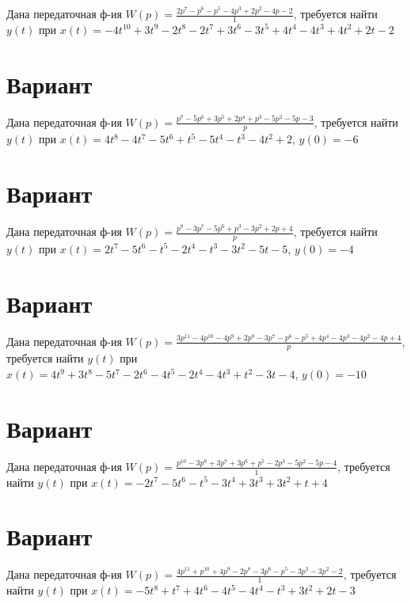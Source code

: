 \documentclass{article}
\begin{document}
Дана передаточная ф-ия $W(p)=\frac{2p^{7}-p^{6}-p^{5}-4p^{3}+2p^{2}-4p-2}{1}$, требуется найти $y(t)$ при $x(t)=-4t^{10}+3t^{9}-2t^{8}-2t^{7}+3t^{6}-3t^{5}+4t^{4}-4t^{3}+4t^{2}+2t-2$



\section{Вариант}

Дана передаточная ф-ия $W(p)=\frac{p^{7}-5p^{6}+3p^{5}+2p^{4}+p^{3}-5p^{2}-5p-3}{p}$, требуется найти $y(t)$ при $x(t)=4t^{8}-4t^{7}-5t^{6}+t^{5}-5t^{4}-t^{3}-4t^{2}+2$, $y(0)=-6$



\section{Вариант}

Дана передаточная ф-ия $W(p)=\frac{p^{8}-3p^{7}-5p^{6}+p^{3}-3p^{2}+2p+4}{p}$, требуется найти $y(t)$ при $x(t)=2t^{7}-5t^{6}-t^{5}-2t^{4}-t^{3}-3t^{2}-5t-5$, $y(0)=-4$



\section{Вариант}

Дана передаточная ф-ия $W(p)=\frac{3p^{11}-4p^{10}-4p^{9}+2p^{8}-3p^{7}-p^{6}-p^{5}+4p^{4}-4p^{3}-4p^{2}-4p+4}{p}$, требуется найти $y(t)$ при $x(t)=4t^{9}+3t^{8}-5t^{7}-2t^{6}-4t^{5}-2t^{4}-4t^{3}+t^{2}-3t-4$, $y(0)=-10$



\section{Вариант}

Дана передаточная ф-ия $W(p)=\frac{p^{10}-3p^{8}+3p^{7}+3p^{6}+p^{5}-2p^{3}-5p^{2}-5p-4}{1}$, требуется найти $y(t)$ при $x(t)=-2t^{7}-5t^{6}-t^{5}-3t^{4}+3t^{3}+3t^{2}+t+4$



\section{Вариант}

Дана передаточная ф-ия $W(p)=\frac{4p^{11}+p^{10}+4p^{9}-2p^{8}-3p^{6}-p^{5}-3p^{3}-3p^{2}-2}{1}$, требуется найти $y(t)$ при $x(t)=-5t^{8}+t^{7}+4t^{6}-4t^{5}-4t^{4}-t^{3}+3t^{2}+2t-3$
\end{document}
